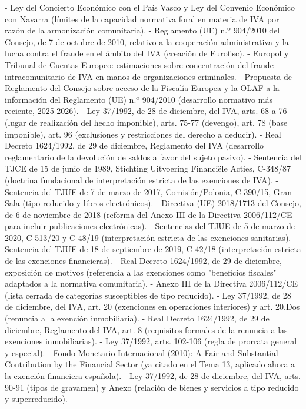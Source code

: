 \documentclass[10pt,a4paper]{article}
\begin{document}
- Ley del Concierto Económico con el País Vasco y Ley del Convenio Económico con Navarra (límites de la capacidad normativa foral en materia de IVA por razón de la armonización comunitaria).
- Reglamento (UE) n.º 904/2010 del Consejo, de 7 de octubre de 2010, relativo a la cooperación administrativa y la lucha contra el fraude en el ámbito del IVA (creación de Eurofisc).
- Europol y Tribunal de Cuentas Europeo: estimaciones sobre concentración del fraude intracomunitario de IVA en manos de organizaciones criminales.
- Propuesta de Reglamento del Consejo sobre acceso de la Fiscalía Europea y la OLAF a la información del Reglamento (UE) n.º 904/2010 (desarrollo normativo más reciente, 2025-2026).
- Ley 37/1992, de 28 de diciembre, del IVA, arts. 68 a 76 (lugar de realización del hecho imponible), arts. 75-77 (devengo), art. 78 (base imponible), art. 96 (exclusiones y restricciones del derecho a deducir).
- Real Decreto 1624/1992, de 29 de diciembre, Reglamento del IVA (desarrollo reglamentario de la devolución de saldos a favor del sujeto pasivo).
- Sentencia del TJCE de 15 de junio de 1989, Stichting Uitvoering Financiële Acties, C-348/87 (doctrina fundacional de interpretación estricta de las exenciones de IVA).
- Sentencia del TJUE de 7 de marzo de 2017, Comisión/Polonia, C-390/15, Gran Sala (tipo reducido y libros electrónicos).
- Directiva (UE) 2018/1713 del Consejo, de 6 de noviembre de 2018 (reforma del Anexo III de la Directiva 2006/112/CE para incluir publicaciones electrónicas).
- Sentencias del TJUE de 5 de marzo de 2020, C-513/20 y C-48/19 (interpretación estricta de las exenciones sanitarias).
- Sentencia del TJUE de 18 de septiembre de 2019, C-42/18 (interpretación estricta de las exenciones financieras).
- Real Decreto 1624/1992, de 29 de diciembre, exposición de motivos (referencia a las exenciones como "beneficios fiscales" adaptados a la normativa comunitaria).
- Anexo III de la Directiva 2006/112/CE (lista cerrada de categorías susceptibles de tipo reducido).
- Ley 37/1992, de 28 de diciembre, del IVA, art. 20 (exenciones en operaciones interiores) y art. 20.Dos (renuncia a la exención inmobiliaria).
- Real Decreto 1624/1992, de 29 de diciembre, Reglamento del IVA, art. 8 (requisitos formales de la renuncia a las exenciones inmobiliarias).
- Ley 37/1992, arts. 102-106 (regla de prorrata general y especial).
- Fondo Monetario Internacional (2010): A Fair and Substantial Contribution by the Financial Sector (ya citado en el Tema 13, aplicado ahora a la exención financiera española).
- Ley 37/1992, de 28 de diciembre, del IVA, arts. 90-91 (tipos de gravamen) y Anexo (relación de bienes y servicios a tipo reducido y superreducido).
\end{document}
